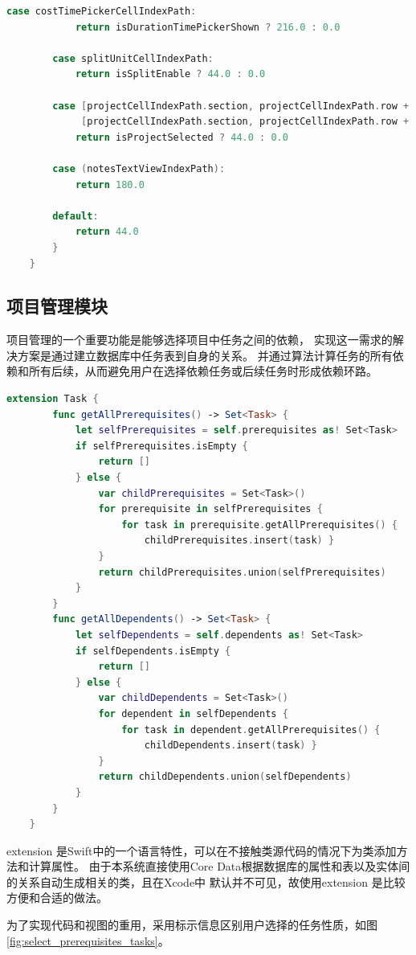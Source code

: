 \begin{lstlisting}[language={Swift}, caption={动态调整行高以便输入}]
        case costTimePickerCellIndexPath:
            return isDurationTimePickerShown ? 216.0 : 0.0
        
        case splitUnitCellIndexPath:
            return isSplitEnable ? 44.0 : 0.0
            
        case [projectCellIndexPath.section, projectCellIndexPath.row + 1],
             [projectCellIndexPath.section, projectCellIndexPath.row + 2]:
            return isProjectSelected ? 44.0 : 0.0
            
        case (notesTextViewIndexPath):
            return 180.0
        
        default:
            return 44.0
        }
    }
\end{lstlisting}

\subsection{项目管理模块}
项目管理的一个重要功能是能够选择项目中任务之间的依赖，
实现这一需求的解决方案是通过建立数据库中任务表到自身的关系。
并通过算法计算任务的所有依赖和所有后续，从而避免用户在选择依赖任务或后续任务时形成依赖环路\parencite{cormen2009introduction}。 

\begin{lstlisting}[language={Swift}, caption={计算任务依赖关系的代码}]
	extension Task {
		func getAllPrerequisites() -> Set<Task> {
			let selfPrerequisites = self.prerequisites as! Set<Task>
			if selfPrerequisites.isEmpty {
				return []
			} else {
				var childPrerequisites = Set<Task>()
				for prerequisite in selfPrerequisites {
					for task in prerequisite.getAllPrerequisites() {
						childPrerequisites.insert(task) }
				}
				return childPrerequisites.union(selfPrerequisites)
			}
		}
		func getAllDependents() -> Set<Task> {
			let selfDependents = self.dependents as! Set<Task>
			if selfDependents.isEmpty {
				return []
			} else {
				var childDependents = Set<Task>()
				for dependent in selfDependents {
					for task in dependent.getAllPrerequisites() {
						childDependents.insert(task) }
				}
				return childDependents.union(selfDependents)
			}
		}
	}
\end{lstlisting}

extension 是Swift中的一个语言特性，可以在不接触类源代码的情况下为类添加方法和计算属性。
由于本系统直接使用Core Data根据数据库的属性和表以及实体间的关系自动生成相关的类，且在Xcode中
默认并不可见，故使用extension 是比较方便和合适的做法。

为了实现代码和视图的重用，采用标示信息区别用户选择的任务性质，如图\ref{fig:select_prerequisites_tasks}。

